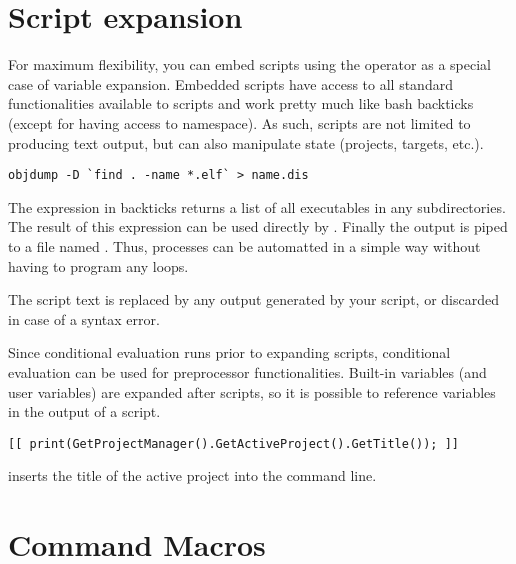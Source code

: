 \section{Script expansion}

For maximum flexibility, you can embed scripts using the \codeline{[[ ]]} operator as a special case of variable expansion. Embedded scripts have access to all standard functionalities available to scripts and work pretty much like bash backticks (except for having access to \codeblocks namespace). As such, scripts are not limited to producing text output, but can also manipulate \codeblocks state (projects, targets, etc.).



\begin{lstlisting}
objdump -D `find . -name *.elf` > name.dis
\end{lstlisting}

The expression in backticks returns a list of all executables  in any subdirectories. The result of this expression can be used directly by . Finally the output is piped to a file named  . Thus, processes can be automatted in a simple way without having to program any loops.


The script text is replaced by any output generated by your script, or discarded in case of a syntax error.

Since conditional evaluation runs prior to expanding scripts, conditional evaluation can be used for preprocessor functionalities. Built-in variables (and user variables) are expanded after scripts, so it is possible to reference variables in the output of a script.

\begin{lstlisting}
[[ print(GetProjectManager().GetActiveProject().GetTitle()); ]]
\end{lstlisting}

inserts the title of the active project into the command line.

\section{Command Macros}\label{sec:command_macros}

